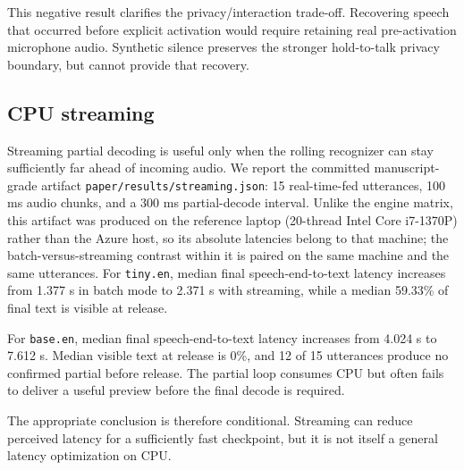 This negative result clarifies the privacy/interaction trade-off. Recovering speech that occurred
before explicit activation would require retaining real pre-activation microphone audio. Synthetic
silence preserves the stronger hold-to-talk privacy boundary, but cannot provide that recovery.

\subsection{CPU streaming}

Streaming partial decoding is useful only when the rolling recognizer can stay sufficiently far
ahead of incoming audio. We report the committed manuscript-grade artifact
\texttt{paper/results/streaming.json}: 15 real-time-fed utterances, 100 ms audio chunks, and a
300 ms partial-decode interval. Unlike the engine matrix, this artifact was produced on the
reference laptop (20-thread Intel Core i7-1370P) rather than the Azure host, so its absolute
latencies belong to that machine; the batch-versus-streaming contrast within it is paired on the
same machine and the same utterances. For \texttt{tiny.en}, median final speech-end-to-text
latency increases from 1.377 s in batch mode to 2.371 s with streaming, while a median 59.33\%
of final text is visible at release.

For \texttt{base.en}, median final speech-end-to-text latency increases from 4.024 s to 7.612 s.
Median visible text at release is 0\%, and 12 of 15 utterances produce no confirmed partial
before release. The partial loop consumes CPU but often fails to deliver a useful preview before
the final decode is required.

The appropriate conclusion is therefore conditional. Streaming can reduce perceived latency for
a sufficiently fast checkpoint, but it is not itself a general latency optimization on CPU.